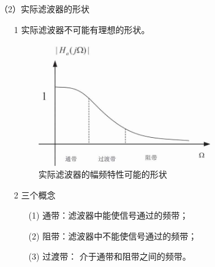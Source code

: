 \documentclass[notheorems,compress,mathserif,table]{beamer}
\begin{document}
\begin{frame}[shrink]\frametitle{}%
（2）实际滤波器的形状
   \begin{enumerate}
     \item [1]实际滤波器不可能有理想的形状。
       \begin{figure}[h]
            \centering
            \includegraphics[width=0.7\textwidth]{fig3sjlbqtx.jpg}
            \caption{实际滤波器的幅频特性可能的形状}
        \end{figure}
     \item [2]三个概念
           \begin{enumerate}
             \item [(1)] 通带：滤波器中能使信号通过的频带；
             \item [(2)] 阻带：滤波器中不能使信号通过的频带；
             \item [(3)] 过渡带： 介于通带和阻带之间的频带。
           \end{enumerate}
  \end{enumerate}
\end{frame}
\end{document}
